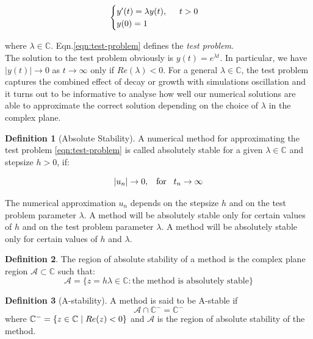 \documentclass[11pt]{article}
\theoremstyle{theorem}
\theoremstyle{definition}
\newtheorem{definition}{Definition}
\begin{document}
\begin{align}
\label{eqn:test-problem}
\begin{cases}
y'(t)=\lambda y(t),\hspace{5mm}t>0\\
y(0)=1
\end{cases}
\end{align}

where $\lambda\in\mathbb{C}$. Eqn.\eqref{eqn:test-problem} defines the \emph{test problem}.\\
The solution to the test problem obviously is $y(t)=e^{\lambda t}$. In particular, we have $|y(t)|\rightarrow 0$ as $t\rightarrow \infty$ only if $Re(\lambda)<0$. For a general $\lambda\in\mathbb{C}$, the test problem captures the combined effect of decay or growth with simulations oscillation and it turns out to be informative to analyse how well our numerical solutions are able to approximate the correct solution depending on the choice of $\lambda$ in the complex plane.\\

\begin{definition}[Absolute Stability]
	\label{def:abs-stability}
	A numerical method for approximating the test problem \eqref{eqn:test-problem} is called absolutely stable for a given $\lambda\in\mathbb{C}$ and stepsize $h>0$, if:
	
	$$|u_n|\rightarrow 0,\hspace{3mm}\text{for}\hspace{3mm} t_n\rightarrow\infty$$	 
\end{definition}

The numerical approximation $u_n$ depends on the stepsize $h$ and on the test problem parameter $\lambda$. A method will be absolutely stable only for certain values of $h$ and on the test problem parameter $\lambda$. A method will be absolutely stable only for certain values of $h$ and $\lambda$. 

\begin{definition}
	\label{def:region-abs-stab}
	The region of absolute stability of a method is the complex plane region $\mathcal{A}\subset\mathbb{C}$ such that:
	$$ \mathcal{A}=\lbrace z=h\lambda\in\mathbb{C}: \text{the method is absolutely stable} \rbrace$$
\end{definition}

\begin{definition}[A-stability]
	\label{def:A-stability}
	A method is said to be A-stable if
	$$\mathcal{A}\cap\mathbb{C}^{-}=\mathbb{C}^{-}$$
	where $\mathbb{C}^{-}=\lbrace z\in\mathbb{C}\hspace{1mm}|\hspace{1mm}Re(z)<0\rbrace$ and $\mathcal{A}$ is the region of absolute stability of the method.\\ 
\end{definition}
 
\end{document}
